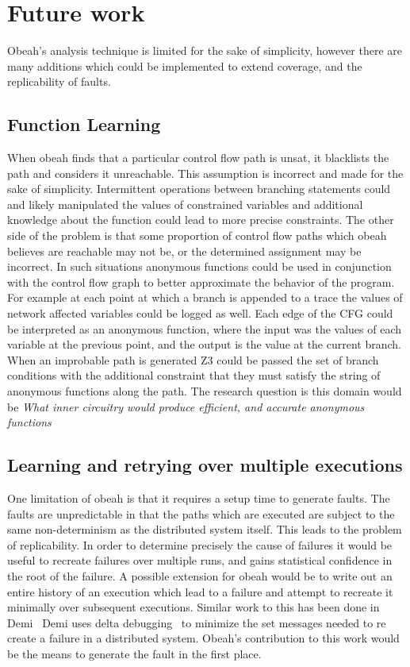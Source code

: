 \section{Future work}
\label{sec:future}

Obeah's analysis technique is limited for the sake of simplicity, however there
are many additions which could be implemented to extend coverage, and the
replicability of faults.

\subsection{Function Learning}

When obeah finds that a particular control flow path is unsat, it blacklists
the path and considers it unreachable. This assumption is incorrect and made
for the sake of simplicity. Intermittent operations between branching statements
could and likely manipulated the values of constrained variables and additional
knowledge about the function could lead to more precise constraints. The other
side of the problem is that some proportion of control flow paths which obeah
believes are reachable may not be, or the determined assignment may be
incorrect. In such situations anonymous functions could be used in conjunction
with the control flow graph to better approximate the behavior of the program.
For example at each point at which a branch is appended to a trace the values
of network affected variables could be logged as well. Each edge of the CFG
could be interpreted as an anonymous function, where the input was the values
of each variable at the previous point, and the output is the value at the
current branch. When an improbable path is generated Z3 could be passed the set
of branch conditions with the additional constraint that they must satisfy the
string of anonymous functions along the path. The research question is this
domain would be \emph{What inner circuitry would produce efficient, and accurate
anonymous functions}

\subsection{Learning and retrying over multiple executions}

One limitation of obeah is that it requires a setup time to generate faults.
The faults are unpredictable in that the paths which are executed are subject
to the same non-determinism as the distributed system itself. This leads to
the problem of replicability. In order to determine precisely the cause of
failures it would be useful to recreate failures over multiple runs, and gains
statistical confidence in the root of the failure. A possible extension for
obeah would be to write out an entire history of an execution which lead to a
failure and attempt to recreate it minimally over subsequent executions.
Similar work to this has been done in Demi~\cite{194938} Demi uses delta
debugging~\cite{STVR:STVR1574} to minimize the set messages needed to re create
a failure in a distributed system. Obeah's contribution to this work would be
the means to generate the fault in the first place.

